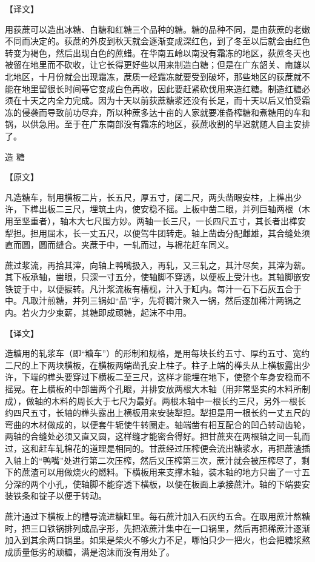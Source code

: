 \documentclass[12pt,UTF8]{ctexbook}
\begin{document}
【译文】

用荻蔗可以造出冰糖、白糖和红糖三个品种的糖。糖的品种不同，是由荻蔗的老嫩不同而决定的。荻蔗的外皮到秋天就会逐渐变成深红色，到了冬至以后就会由红色转变为褐色，然后出现白色的蔗蜡。在华南五岭以南没有霜冻的地区，荻蔗冬天也被留在地里而不砍收，让它长得更好些以用来制造白糖；但是在广东韶关、南雄以北地区，十月份就会出现霜冻，蔗质一经霜冻就要受到破坏，那些地区的荻蔗就不能在地里留很长时间等它变成白色再收，因此要赶紧砍伐用来造红糖。制造红糖必须在十天之内全力完成。因为十天以前荻蔗糖浆还没有长足，而十天以后又怕受霜冻的侵袭而导致前功尽弃，所以种蔗多达十亩的人家就要准备榨糖和煮糖用的车和锅，以供急用。至于在广东南部没有霜冻的地区，荻蔗收割的早迟就随人自主安排了。

造 糖

【原文】

凡造糖车，制用横板二片，长五尺，厚五寸，阔二尺，两头凿眼安柱，上榫出少许，下榫出板二三尺，埋筑土内，使安稳不摇。上板中凿二眼，并列巨轴两根（木用至坚重者），轴木大七尺围方妙。两轴一长三尺，一长四尺五寸，其长者出榫安犁担。担用屈木，长一丈五尺，以便驾牛团转走。轴上凿齿分配雌雄，其合缝处须直而圆，圆而缝合。夹蔗于中，一轧而过，与棉花赶车同义。

蔗过浆流，再拾其滓，向轴上鸭嘴扱入，再轧，又三轧之，其汁尽矣，其滓为薪。其下板承轴，凿眼，只深一寸五分，使轴脚不穿透，以便板上受汁也。其轴脚嵌安铁锭于中，以便捩转。凡汁浆流板有槽枧，汁入于缸内。每汁一石下石灰五合于中。凡取汁煎糖，并列三锅如“品”字，先将稠汁聚入一锅，然后逐加稀汁两锅之内。若火力少束薪，其糖即成顽糖，起沫不中用。

【译文】

造糖用的轧浆车（即“糖车”）的形制和规格，是用每块长约五寸、厚约五寸、宽约二尺的上下两块横板，在横板两端凿孔安上柱子。柱子上端的榫头从上横板露出少许，下端的榫头要穿过下横板二至三尺，这样才能埋在地下，使整个车身安稳而不摇晃。在上横板的中部凿两个孔眼，并排安放两根大木轴（用非常坚实的木料所制成），做轴的木料的周长大于七尺为最好。两根木轴中一根长约三尺，另外一根长约四尺五寸，长轴的榫头露出上横板用来安装犁担。犁担是用一根长约一丈五尺的弯曲的木材做成的，以便套牛轭使牛转圈走。轴端凿有相互配合的凹凸转动齿轮，两轴的合缝处必须又直又圆，这样缝才能密合得好。把甘蔗夹在两根轴之间一轧而过，这和赶车轧棉花的道理是相同的。甘蔗经过压榨便会流出糖浆水，再把蔗渣插入轴上的“鸭嘴”处进行第二次压榨，然后又压榨第三次，蔗汁就会被压榨尽了，剩下的蔗渣可以用做烧火的燃料。下横板用来支撑木轴，装木轴的地方只凿了一寸五分深的两个小孔，使轴脚不能穿透下横板，以便在板面上承接蔗汁。轴的下端要安装铁条和锭子以便于转动。

蔗汁通过下横板上的槽导流进糖缸里。每石蔗汁加入石灰约五合。在取用蔗汁熬糖时，把三口铁锅排列成品字形，先把浓蔗汁集中在一口锅里，然后再把稀蔗汁逐渐加入到其余两口锅里。如果是柴火不够火力不足，哪怕只少一把火，也会把糖浆熬成质量低劣的顽糖，满是泡沫而没有用处了。
\end{document}
